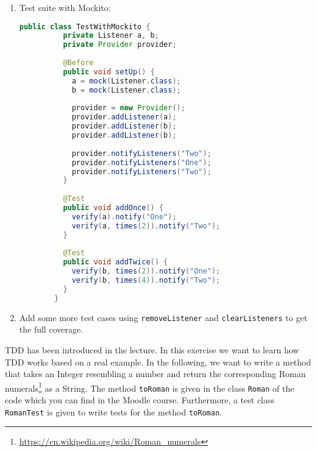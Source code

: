 \documentclass[language=en,sheet=1,prefix]{exercise}
\begin{document}
\begin{solution}
\begin{enumerate}
    \item Test suite with Mockito:

      \begin{lstlisting}[language=Java,gobble=8]
        public class TestWithMockito {
          private Listener a, b;
          private Provider provider;
          
          @Before
          public void setUp() {
            a = mock(Listener.class);
            b = mock(Listener.class);
            
            provider = new Provider();
            provider.addListener(a);
            provider.addListener(b);
            provider.addListener(b);
            
            provider.notifyListeners("Two");
            provider.notifyListeners("One");
            provider.notifyListeners("Two");
          }
          
          @Test
          public void addOnce() {
            verify(a).notify("One");
            verify(a, times(2)).notify("Two");
          }
          
          @Test
          public void addTwice() {
            verify(b, times(2)).notify("One");
            verify(b, times(4)).notify("Two");
          }
        }
      \end{lstlisting}

    \item Add some more test cases using \lstinline-removeListener- and \lstinline-clearListeners- to get the full coverage.
  \end{enumerate}
\end{solution}


TDD has been introduced in the lecture. In this exercise we want to learn how TDD works based on a real example. In the following, we want to write a method that takes an Integer resembling a number and return the corresponding Roman numerals\footnote{\url{https://en.wikipedia.org/wiki/Roman_numerals}} as a String.
The method \lstinline[language = java]{toRoman} is given in the class \lstinline[language = java]{Roman} of the code which you can find in the Moodle course. Furthermore, a test class \lstinline[language = java]{RomanTest} is given to write tests for the method \lstinline[language = java]{toRoman}.
\end{document}
